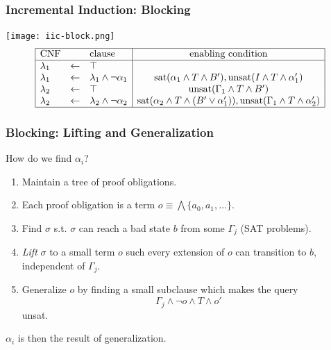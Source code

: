 \documentclass{beamer}
\begin{document}
\begin{frame}
	\frametitle{Incremental Induction: Blocking}
	\begin{center}
		\texttt{[image: iic-block.png]}
		\[ \begin{array}{|lcl|c|}
			\hline
			\mbox{CNF} &           & \mbox{clause} & \mbox{enabling condition}\\
			\hline
			\lambda_1 & \leftarrow & \top & \\
			\lambda_1 & \leftarrow & \lambda_1 \wedge \neg \alpha_1 & \mbox{sat}(\alpha_1 \wedge T \wedge B'), \mbox{unsat}(I \wedge T \wedge \alpha'_1) \\
			\lambda_2 & \leftarrow & \top & \mbox{unsat}(\Gamma_1 \wedge T \wedge B') \\
			\lambda_2 & \leftarrow & \lambda_2 \wedge \neg \alpha_2 & \mbox{sat}(\alpha_2 \wedge T \wedge (B' \vee \alpha'_1)),\mbox{unsat}(\Gamma_1 \wedge T \wedge \alpha'_2)\\
			\hline
		\end{array} \]
	\end{center}
\end{frame}

\begin{frame}
	\frametitle{Blocking: Lifting and Generalization}
	How do we find $\alpha_i$?
	\begin{enumerate}
		\item Maintain a tree of proof obligations.
		\item Each proof obligation is a term $o \equiv \bigwedge \{ a_0, a_1, \ldots \}$.
		\item Find $\sigma$ s.t. $\sigma$ can reach a bad state $b$
			from some $\Gamma_j$ (SAT problems).
		\item {\em Lift} $\sigma$ to a small term $o$ such every extension of $o$ can transition
			to $b$, independent of $\Gamma_j$. 
		\item Generalize $o$ by finding a small subclause which makes the query
			$$\Gamma_j \wedge \neg o \wedge T \wedge o'$$
			unsat.
	\end{enumerate}
		$\alpha_i$ is then the result of generalization.
\end{frame}
\end{document}
